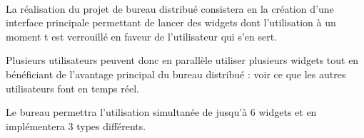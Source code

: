\paragraph{}La réalisation du projet de bureau distribué consistera en la création d'une interface principale permettant de lancer des widgets dont l'utilisation à un moment t est verrouillé en faveur de l'utilisateur qui s'en sert. 

Plusieurs utilisateurs peuvent donc en parallèle utiliser plusieurs widgets tout en bénéficiant de l'avantage principal du bureau distribué : voir ce que les autres utilisateurs font en temps réel.

Le bureau permettra l'utilisation simultanée de jusqu'à 6 widgets et en implémentera {\color{yellow}3} types différents.